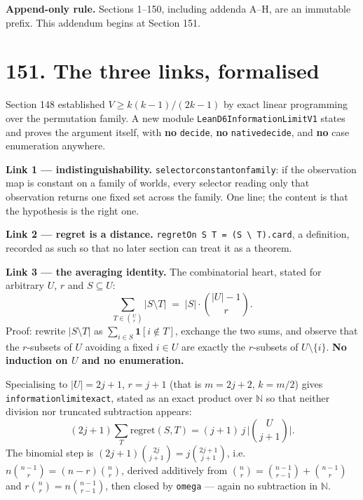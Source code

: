 \documentclass[9pt,twocolumn]{article}
\renewcommand{\_}{\CIGunderscore\allowbreak}
\begin{document}
\sloppy
\twocolumn[{\begin{center}
{\LARGE\bfseries Report 5 - D6 Product-Reference / Decision Interaction}\\[2pt]
{\large\itshape Append-only update I: the information limit's three links written in Lean without any enumeration, and the m=10 gap measured to be out of reach of the current instrument}\\[2pt]
{\small CIG-AMF Scientific Evolution Report -- 8 September (fourth update)}
\end{center}\vspace{2mm}}]

\textbf{Append-only rule.} Sections 1--150, including addenda A--H, are an immutable prefix. This addendum begins at Section 151.

\section*{151. The three links, formalised}
Section 148 established $V\ge k(k-1)/(2k-1)$ by exact linear programming over the permutation family. A new module \texttt{Lean\allowbreak D6\allowbreak Information\allowbreak LimitV1} states and proves the argument itself, with \textbf{no} \texttt{decide}, \textbf{no} \texttt{native\_decide}, and \textbf{no} case enumeration anywhere.

\textbf{Link 1 --- indistinguishability.} \texttt{selector\_constant\_on\_family}: if the observation map is constant on a family of worlds, every selector reading only that observation returns one fixed set across the family. One line; the content is that the hypothesis is the right one.

\textbf{Link 2 --- regret is a distance.} \texttt{regretOn S T = (S \textbackslash{} T).card}, a definition, recorded as such so that no later section can treat it as a theorem.

\textbf{Link 3 --- the averaging identity.} The combinatorial heart, stated for arbitrary $U$, $r$ and $S\subseteq U$:
\[\sum_{T\in\binom{U}{r}}|S\setminus T| \;=\; |S|\cdot\binom{|U|-1}{r}.\]
Proof: rewrite $|S\setminus T|$ as $\sum_{i\in S}\mathbf 1[i\notin T]$, exchange the two sums, and observe that the $r$-subsets of $U$ avoiding a fixed $i\in U$ are exactly the $r$-subsets of $U\setminus\{i\}$. \textbf{No induction on $U$ and no enumeration.}

Specialising to $|U|=2j+1$, $r=j+1$ (that is $m=2j+2$, $k=m/2$) gives \texttt{information\_limit\_exact}, stated as an exact product over $\mathbb N$ so that neither division nor truncated subtraction appears:
\[(2j+1)\sum_{T}\mathrm{regret}(S,T)=(j+1)\,j\,\Big|\binom{U}{j+1}\Big|.\]
The binomial step is $ (2j+1)\binom{2j}{j+1}=j\binom{2j+1}{j+1}$, i.e.\ $n\binom{n-1}{r}=(n-r)\binom{n}{r}$, derived additively from $\binom{n}{r}=\binom{n-1}{r-1}+\binom{n-1}{r}$ and $r\binom{n}{r}=n\binom{n-1}{r-1}$, then closed by \texttt{omega} --- again no subtraction in $\mathbb N$.
\end{document}
